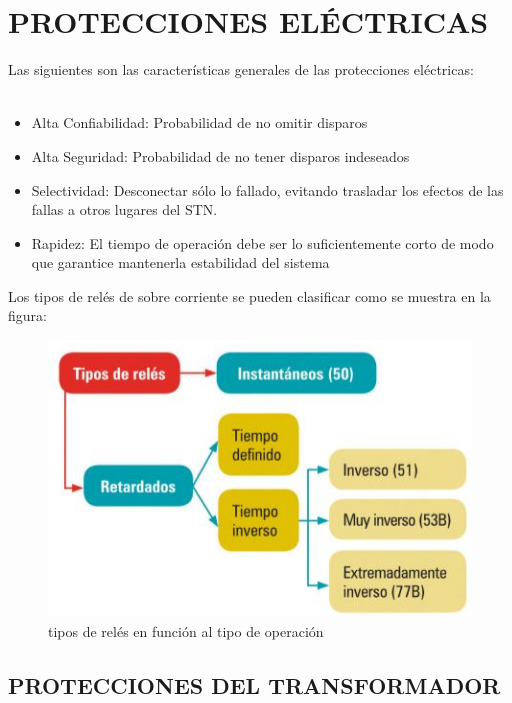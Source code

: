 \documentclass[a5paper]{book}%
\begin{document}
    \chapter{PROTECCIONES ELÉCTRICAS}

    Las siguientes son las características generales de las protecciones eléctricas:\\\\
\begin{itemize}
	\item Alta Confiabilidad: Probabilidad de no omitir disparos
	\item Alta Seguridad: Probabilidad de no tener disparos indeseados
	\item Selectividad: Desconectar sólo lo fallado, evitando trasladar los efectos de las fallas a otros lugares del STN. 
	\item Rapidez: El tiempo de operación debe ser lo suficientemente corto de modo que garantice mantenerla estabilidad del sistema
\end{itemize}

Los tipos de relés de sobre corriente se pueden clasificar como se muestra en la figura:

\begin{figure}[H]
      \centering
      
      \caption{tipos de relés en función al tipo de operación}
      \label{fig:tiporele}
      \includegraphics[width=\linewidth]{tipos_rele}
    \end{figure}

    \section{PROTECCIONES DEL TRANSFORMADOR}
\end{document}
